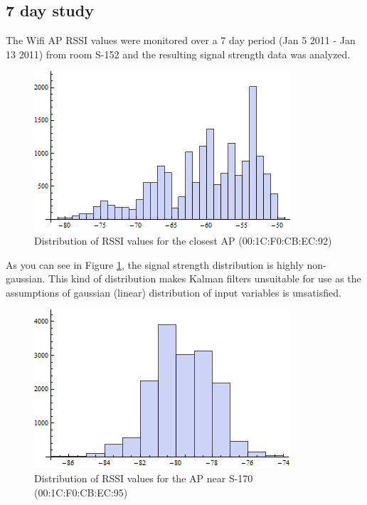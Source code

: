 \subsection{7 day study}

The Wifi AP RSSI values were monitored over a 7 day period (Jan 5 2011 - Jan 13 2011) from room S-152
and the resulting signal strength data was analyzed.

\begin{figure}\centering
    \includegraphics{figures/histogram_00_1C_F0_CB_EC_92.png}
    \caption{Distribution of RSSI values for the closest AP (00:1C:F0:CB:EC:92) \label{fig:histogram_00_1C_F0_CB_EC_92}}
\end{figure}

As you can see in Figure \ref{fig:histogram_00_1C_F0_CB_EC_92}, the signal strength
distribution is highly non-gaussian. This kind of distribution makes Kalman filters
unsuitable for use as the assumptions of gaussian (linear) distribution of 
input variables is unsatisfied.

\begin{figure}\centering
    \includegraphics{figures/histogram_00_1C_F0_CB_EC_95.png}
    \caption{Distribution of RSSI values for the AP near S-170 (00:1C:F0:CB:EC:95) \label{fig:histogram_00_1C_F0_CB_EC_95}}
\end{figure}

